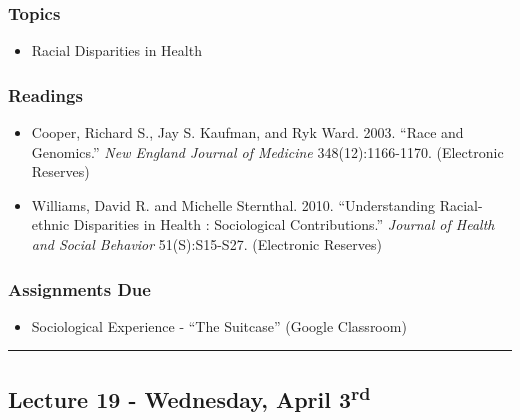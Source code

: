 \documentclass[]{book}
\providecommand{\tightlist}{%
  \setlength{\itemsep}{0pt}\setlength{\parskip}{0pt}}
\begin{document}
\hypertarget{topics-21}{%
\subsubsection*{Topics}\label{topics-21}}

\begin{itemize}
\tightlist
\item
  Racial Disparities in Health
\end{itemize}

\hypertarget{readings-19}{%
\subsubsection*{Readings}\label{readings-19}}

\begin{itemize}
\tightlist
\item
  Cooper, Richard S., Jay S. Kaufman, and Ryk Ward. 2003. ``Race and Genomics.'' \emph{New England Journal of Medicine} 348(12):1166-1170. (Electronic Reserves)
\item
  Williams, David R. and Michelle Sternthal. 2010. ``Understanding Racial-ethnic Disparities in Health : Sociological Contributions.'' \emph{Journal of Health and Social Behavior} 51(S):S15-S27. (Electronic Reserves)
\end{itemize}

\hypertarget{assignments-due-5}{%
\subsubsection*{Assignments Due}\label{assignments-due-5}}

\begin{itemize}
\tightlist
\item
  Sociological Experience - ``The Suitcase'' (Google Classroom)
\end{itemize}

\begin{center}\rule{0.5\linewidth}{\linethickness}\end{center}

\hypertarget{lecture-19---wednesday-april-3rd}{%
\subsection*{\texorpdfstring{Lecture 19 - Wednesday, April 3\textsuperscript{rd}}{Lecture 19 - Wednesday, April 3rd}}\label{lecture-19---wednesday-april-3rd}}
\end{document}
